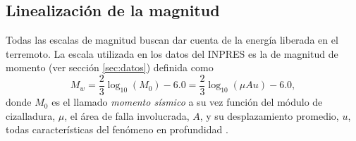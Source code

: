 \documentclass[a4paper]{report}
\begin{document}






\subsection{Linealización de la magnitud}
Todas las escalas de magnitud buscan dar cuenta de la energía liberada en el terremoto.
La escala utilizada en los datos del INPRES es la de magnitud de momento (ver sección \ref{sec:datos}) definida como \cite[ec. 4.23]{fowler_solid_1990}
\begin{equation}
	M_w =
	\frac{2}{3} \log_{10} \left( M_0 \right) - 6.0 = 
	\frac{2}{3} \log_{10} \left( \mu A u \right) - 6.0,
	\label{eq:momento}
\end{equation}
donde \(M_0\) es el llamado \emph{momento sísmico} a su vez función del módulo de cizalladura, \(\mu\), el área de falla involucrada, \(A\), y su desplazamiento promedio, \(u\), todas características del fenómeno en profundidad \cite*[sección 4.2.4]{fowler_solid_1990}.
\end{document}

